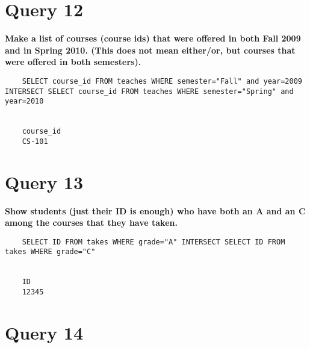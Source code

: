 \documentclass[letterpaper]{article}
\begin{document}
\section{Query 12}

    \textbf{Make a list of courses (course ids) that were offered in both Fall 2009 and in Spring 2010.   (This does not mean either/or, but courses that were offered in both semesters).}
    \begin{lstlisting}
    SELECT course_id FROM teaches WHERE semester="Fall" and year=2009 INTERSECT SELECT course_id FROM teaches WHERE semester="Spring" and year=2010
       
       
    course_id
    CS-101
    \end{lstlisting}
        
\section{Query 13}

    \textbf{Show students (just their ID is enough) who have both an A and an C among the courses that they have taken.}
    \begin{lstlisting}
    SELECT ID FROM takes WHERE grade="A" INTERSECT SELECT ID FROM takes WHERE grade="C"


    ID
    12345
    \end{lstlisting}
        
\section{Query 14}
\end{document}
